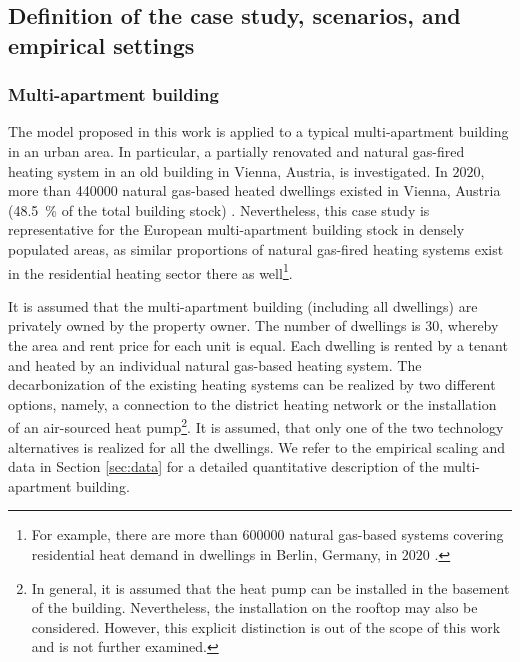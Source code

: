 \subsection{Definition of the case study, scenarios, and empirical settings}\label{met:empirical}
\subsubsection{Multi-apartment building}
The model proposed in this work is applied to a typical multi-apartment building in an urban area. In particular, a partially renovated and natural gas-fired heating system in an old building in Vienna, Austria, is investigated. In $2020$, more than \SI{440000}{} natural gas-based heated dwellings existed in Vienna, Austria (\SI{48.5}{\%} of the total building stock) \cite{statistikaustriaheizen}. Nevertheless, this case study is representative for the European multi-apartment building stock in densely populated areas, as similar proportions of natural gas-fired heating systems exist in the residential heating sector there as well\footnote{For example, there are more than \SI{600000}{} natural gas-based systems covering residential heat demand in dwellings in Berlin, Germany, in $2020$ \cite{BDEW2019}.}.\vspace{0.5cm}

It is assumed that the multi-apartment building (including all dwellings) are privately owned by the property owner. The number of dwellings is $30$, whereby the area and rent price for each unit is equal. Each dwelling is rented by a tenant and heated by an individual natural gas-based heating system. The decarbonization of the existing heating systems can be realized by two different options, namely, a connection to the district heating network or the installation of an air-sourced heat pump\footnote{In general, it is assumed that the heat pump can be installed in the basement of the building. Nevertheless, the installation on the rooftop may also be considered. However, this explicit distinction is out of the scope of this work and is not further examined.}. It is assumed, that only one of the two technology alternatives is realized for all the dwellings. We refer to the empirical scaling and data in Section \ref{sec:data} for a detailed quantitative description of the multi-apartment building. 

